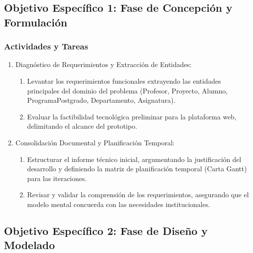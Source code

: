 \subsection{Objetivo Específico 1: Fase de Concepción y Formulación}
\subsubsection{Actividades y Tareas}
\begin{enumerate}
	\item Diagnóstico de Requerimientos y Extracción de Entidades:
	\begin{enumerate}
		\item Levantar los requerimientos funcionales extrayendo las entidades principales del dominio del problema (Profesor, Proyecto, Alumno, ProgramaPostgrado, Departamento, Asignatura).
		\item Evaluar la factibilidad tecnológica preliminar para la plataforma web, delimitando el alcance del prototipo.
	\end{enumerate}
	\item Consolidación Documental y Planificación Temporal:
	\begin{enumerate}
		\item Estructurar el informe técnico inicial, argumentando la justificación del desarrollo y definiendo la matriz de planificación temporal (Carta Gantt) para las iteraciones.
		\item Revisar y validar la comprensión de los requerimientos, asegurando que el modelo mental concuerda con las necesidades institucionales.
	\end{enumerate}
\end{enumerate}

\subsection{Objetivo Específico 2: Fase de Diseño y Modelado}
